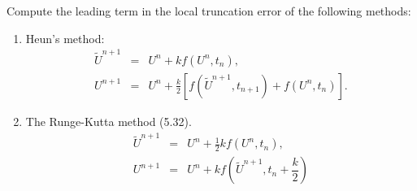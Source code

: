 \documentclass[10pt]{article}
\begin{document}
\begin{problem}[Problem 4]
Compute the leading term in the local truncation error of the following methods:
\begin{enumerate}[label=(\alph*)]
\item
Heun's method:
\begin{eqnarray*}
\tilde{U}^{n+1} & = & U^n + k f( U^n , t_n ) , \\
U^{n+1} & = & U^n + \frac{k}{2} \left[ f( \tilde{U}^{n+1}, t_{n+1} ) + f( U^n , t_n ) \right] .
\end{eqnarray*}
\item
The Runge-Kutta method (5.32).
\begin{eqnarray*}
    \tilde{U}^{n+1} & = & U^n + \frac{1}{2}k f( U^n , t_n ) , \\
U^{n+1} & = & U^n + k f\left( \tilde{U}^{n+1}, t_{n} + \dfrac{k}{2} \right)
\end{eqnarray*}
\end{enumerate}
\end{problem}
\end{document}
